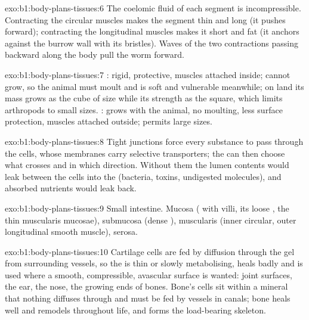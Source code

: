 \begin{solution}{exo:b1:body-plans-tissues:6}
The coelomic fluid of each segment is incompressible. Contracting the
circular muscles makes the segment thin and long (it pushes forward);
contracting the longitudinal muscles makes it short and fat (it anchors
against the burrow wall with its bristles). Waves of the two
contractions passing backward along the body pull the worm forward.
\end{solution}

\begin{solution}{exo:b1:body-plans-tissues:7}
: rigid, protective, muscles attached inside; cannot grow,
so the animal must moult and is soft and vulnerable meanwhile; on land
its mass grows as the cube of size while its strength as the square,
which limits arthropods to small sizes. : grows with the
animal, no moulting, less surface protection, muscles attached outside;
permits large sizes.
\end{solution}

\begin{solution}{exo:b1:body-plans-tissues:8}
Tight junctions force every substance to pass through the cells, whose
membranes carry selective transporters; the  can then choose
what crosses and in which direction. Without them the lumen contents
would leak between the cells into the  (bacteria,
toxins, undigested molecules), and absorbed nutrients would leak back.
\end{solution}

\begin{solution}{exo:b1:body-plans-tissues:9}
Small intestine. Mucosa ( with villi, its loose , the thin muscularis mucosae), submucosa (dense ), muscularis (inner circular, outer longitudinal smooth muscle),
serosa.
\end{solution}

\begin{solution}{exo:b1:body-plans-tissues:10}
Cartilage cells are fed by diffusion through the gel from surrounding
vessels, so the  is thin or slowly metabolising, heals badly and
is used where a smooth, compressible, avascular surface is wanted:
joint surfaces, the ear, the nose, the growing ends of bones. Bone's
cells sit within a mineral that nothing diffuses through and must be
fed by vessels in canals; bone heals well and remodels throughout life,
and forms the load-bearing skeleton.
\end{solution}

